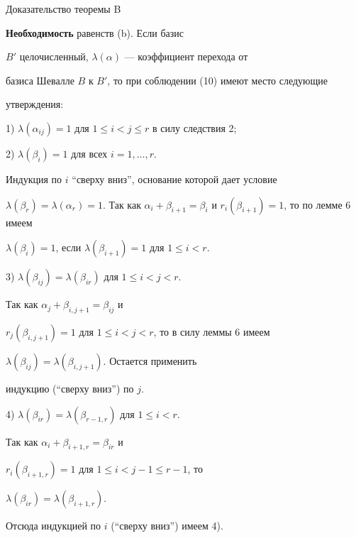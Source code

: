\begin{pf*}{Доказательство теоремы B}


{\bf Необходимость} равенств (b). Если базис


$B'$ целочисленный, $\lambda(\alpha)$ --- коэффициент перехода от


базиса Шевалле $B$ к $B'$, то при соблюдении (10) имеют место следующие


утверждения:





1) $\lambda(\alpha_{ij})=1$ для $1\le i<j\le r$ в силу следствия 2;





2) $\lambda(\beta_i)=1$  для всех $i=1,\dotsc,r$.





\noindent{}Индукция по $i$ ``сверху вниз'', основание которой дает условие


$\lambda(\beta_r)=\lambda(\alpha_r)=1$. Так как $\alpha_i+\beta_{i+1}=


\beta_i$ и $r_i(\beta_{i+1})=1$, то по лемме 6 имеем


$\lambda(\beta_i)=1$, если $\lambda(\beta_{i+1})=1$ для $1\le i<r$.





3) $\lambda(\beta_{ij})=\lambda(\beta_{ir})$ для $1\le i<j<r$.





\noindent{}Так как $\alpha_j+\beta_{i,j+1}=\beta_{ij}$ и


$r_j(\beta_{i,j+1})=1$ для $1\le i<j<r$, то в силу леммы 6 имеем


$\lambda(\beta_{ij})=\lambda(\beta_{i,j+1})$. Остается применить


индукцию (``сверху вниз'') по $j$.





4) $\lambda(\beta_{ir})=\lambda(\beta_{r-1,r})$ для $1\le i<r$.





\noindent{}Так как $\alpha_i+\beta_{i+1,r}=\beta_{ir}$ и


$r_i(\beta_{i+1,r})=1$ для  $1\le i<j-1\le r-1$, то


$\lambda(\beta_{ir})=\lambda(\beta_{i+1,r})$.


Отсюда индукцией по $i$ (``сверху вниз'') имеем 4).






\end{pf*}
